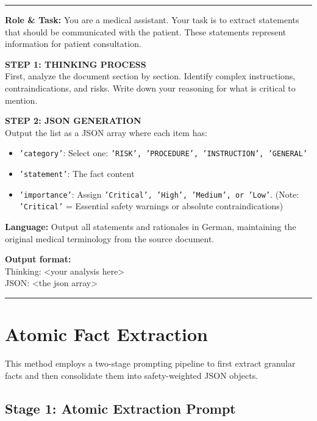 \vspace{0.5em}
\hrule
\vspace{0.5em}

\textbf{Role \& Task:} You are a medical assistant. Your task is to extract statements that should be communicated with the patient. These statements represent information for patient consultation.

\textbf{STEP 1: THINKING PROCESS}\\
First, analyze the document section by section. Identify complex instructions, contraindications, and risks. Write down your reasoning for what is critical to mention.

\textbf{STEP 2: JSON GENERATION}\\
Output the list as a JSON array where each item has:
\begin{itemize}
    \item \texttt{'category'}: Select one: \texttt{'RISK', 'PROCEDURE', 'INSTRUCTION', 'GENERAL'}
    \item \texttt{'statement'}: The fact content
    \item \texttt{'importance'}: Assign \texttt{'Critical', 'High', 'Medium', or 'Low'}. (Note: \texttt{'Critical'} = Essential safety warnings or absolute contraindications)
\end{itemize}

\textbf{Language:} Output all statements and rationales in German, maintaining the original medical terminology from the source document.

\textbf{Output format:}\\
Thinking: <your analysis here>\\
JSON: <the json array>

\vspace{0.5em}
\hrule
\vspace{0.5em}


\section{Atomic Fact Extraction}
\label{app:atomic_extraction_prompt}

This method employs a two-stage prompting pipeline to first extract granular facts and then consolidate them into safety-weighted JSON objects.

\subsection*{Stage 1: Atomic Extraction Prompt}

